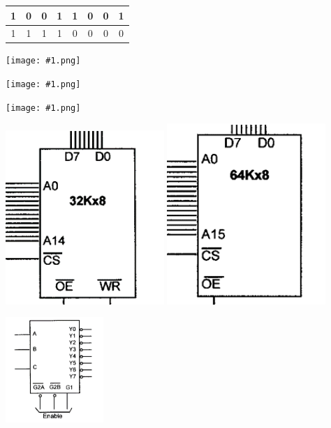 \documentclass[10pt,a4paper]{article}
\def\img#1#2{\begin{tcolorbox}[title=#2]\texttt{[image: \#1.png]}\end{tcolorbox}}
\begin{document}
\begin{CJK}{UTF8}{song}
\begin{twocolumn}
\begin{tcolorbox}[title=逻辑门电路]
\begin{tabular}{|c|c|c|c|c|c|c|c|}
				\hline
				1 & 0 & 0 & 1 & 1 & 0 & 0 & 1 \\
				\hline
				1 & 1 & 1 & 1 & 0 & 0 & 0 & 0 \\
				\hline
			\end{tabular}
		\end{tcolorbox}
		\begin{tcolorbox}[title=锁存器和数据传输器]
			\img{latch}{74LS373 D Latch}
			\img{dt}{Data Bus Transceiver}
		\end{tcolorbox}
		\img{buscycle}{8086/88 总线周期}
		\begin{tcolorbox}[title=RAM\&ROM]
			\centering
				\includegraphics[width=0.45\textwidth]{RAMC.png}
				\includegraphics[width=0.45\textwidth]{ROMC.png}
		\end{tcolorbox}
		\begin{tcolorbox}[title=74LS138 38译码器]
			\includegraphics[height=4cm]{38G.png}

\end{tcolorbox}
\end{twocolumn}
\end{CJK}
\end{document}
